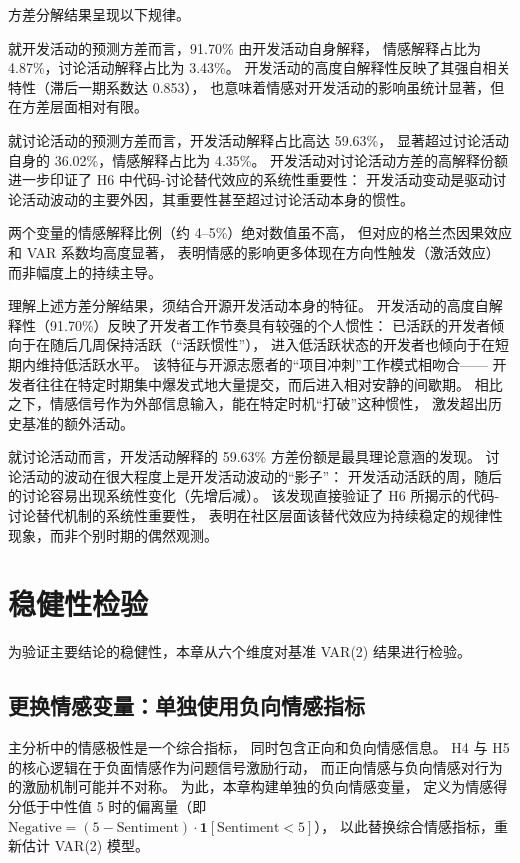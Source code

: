 方差分解结果呈现以下规律。

就开发活动的预测方差而言，91.70\% 由开发活动自身解释，
情感解释占比为 4.87\%，讨论活动解释占比为 3.43\%。
开发活动的高度自解释性反映了其强自相关特性（滞后一期系数达 0.853），
也意味着情感对开发活动的影响虽统计显著，但在方差层面相对有限。

就讨论活动的预测方差而言，开发活动解释占比高达 59.63\%，
显著超过讨论活动自身的 36.02\%，情感解释占比为 4.35\%。
开发活动对讨论活动方差的高解释份额进一步印证了 H6 中代码-讨论替代效应的系统性重要性：
开发活动变动是驱动讨论活动波动的主要外因，其重要性甚至超过讨论活动本身的惯性。

两个变量的情感解释比例（约 4--5\%）绝对数值虽不高，
但对应的格兰杰因果效应和 VAR 系数均高度显著，
表明情感的影响更多体现在方向性触发（激活效应）而非幅度上的持续主导。

理解上述方差分解结果，须结合开源开发活动本身的特征。
开发活动的高度自解释性（91.70\%）反映了开发者工作节奏具有较强的个人惯性：
已活跃的开发者倾向于在随后几周保持活跃（“活跃惯性”），
进入低活跃状态的开发者也倾向于在短期内维持低活跃水平。
该特征与开源志愿者的“项目冲刺”工作模式相吻合——
开发者往往在特定时期集中爆发式地大量提交，而后进入相对安静的间歇期。
相比之下，情感信号作为外部信息输入，能在特定时机“打破”这种惯性，
激发超出历史基准的额外活动。

就讨论活动而言，开发活动解释的 59.63\% 方差份额是最具理论意涵的发现。
讨论活动的波动在很大程度上是开发活动波动的“影子”：
开发活动活跃的周，随后的讨论容易出现系统性变化（先增后减）。
该发现直接验证了 H6 所揭示的代码-讨论替代机制的系统性重要性，
表明在社区层面该替代效应为持续稳定的规律性现象，而非个别时期的偶然观测。


\section{稳健性检验}
\label{sec:robust-2}

为验证主要结论的稳健性，本章从六个维度对基准 VAR(2) 结果进行检验。

\subsection{更换情感变量：单独使用负向情感指标}

主分析中的情感极性是一个综合指标，
同时包含正向和负向情感信息。
H4 与 H5 的核心逻辑在于负面情感作为问题信号激励行动，
而正向情感与负向情感对行为的激励机制可能并不对称。
为此，本章构建单独的负向情感变量，
定义为情感得分低于中性值 5 时的偏离量（即 $\text{Negative} = (5 - \text{Sentiment}) \cdot \mathbf{1}[\text{Sentiment} < 5]$），
以此替换综合情感指标，重新估计 VAR(2) 模型。


